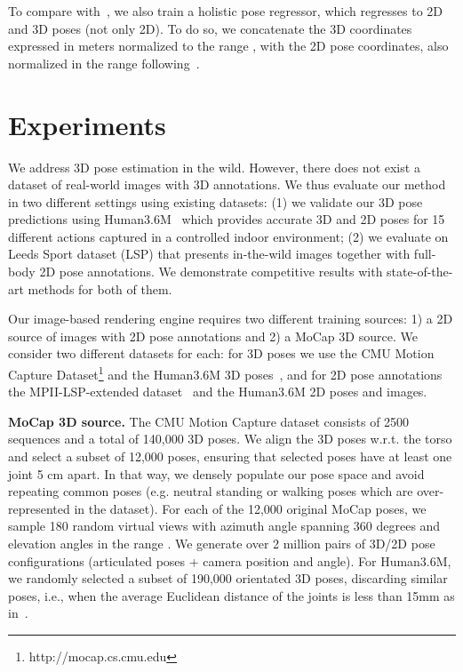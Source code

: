 \documentclass{article}
\begin{document}
To compare with~\cite{ToshevS14_DeepPose}, we also train a holistic pose regressor, which regresses to 2D and 3D poses (not only 2D). To do so, we concatenate the 3D coordinates expressed in meters normalized to the range ,  with the 2D pose coordinates, also normalized in the range  following~\cite{ToshevS14_DeepPose}.






 










 

 \section{Experiments}

We address 3D pose estimation in the wild. However, there does not
exist a dataset of real-world images with 3D annotations. We thus
evaluate our method in two different settings using existing datasets:
(1) we validate our 3D pose predictions using 
Human3.6M~\cite{IonescuPOS14} which provides accurate 3D and 2D poses for 15
different actions captured in a controlled indoor
environment; (2) we evaluate on Leeds Sport dataset
(LSP)\cite{JohnsonE10} that presents in-the-wild images together with
full-body 2D pose annotations.  We demonstrate competitive results
with state-of-the-art methods for both of them. 

Our image-based rendering engine requires two different training
sources: 1) a 2D source of images with 2D pose annotations and 2) a MoCap 3D source. We consider two different datasets for each: for 3D
poses we use the CMU Motion Capture
Dataset\footnote{http://mocap.cs.cmu.edu} and the Human3.6M 3D
poses~\cite{IonescuPOS14}, and for 2D pose annotations the
MPII-LSP-extended dataset~\cite{PishchulinITAAG15} and the Human3.6M 2D poses and images.










{\noindent \bf MoCap 3D source.} The CMU Motion Capture dataset consists of 2500 sequences and a total of 140,000 3D poses. We align the 3D poses w.r.t. the torso and select a subset of 12,000 poses, ensuring that selected poses have at least one joint 5 cm apart. In that way, we densely populate our pose space and avoid repeating common poses (e.g. neutral standing or walking poses which are over-represented in the dataset). For each of the 12,000 original MoCap poses, we sample 180 random virtual views with azimuth angle spanning 360 degrees and elevation angles in the range . We generate over 2 million pairs of 3D/2D pose configurations (articulated poses + camera position and angle). 
For Human3.6M, we 
randomly selected a subset of 190,000 orientated 3D poses, discarding similar poses, i.e., when the average Euclidean distance of the joints is less than 15mm as in~\cite{IqbalGG16}. 
\end{document}
